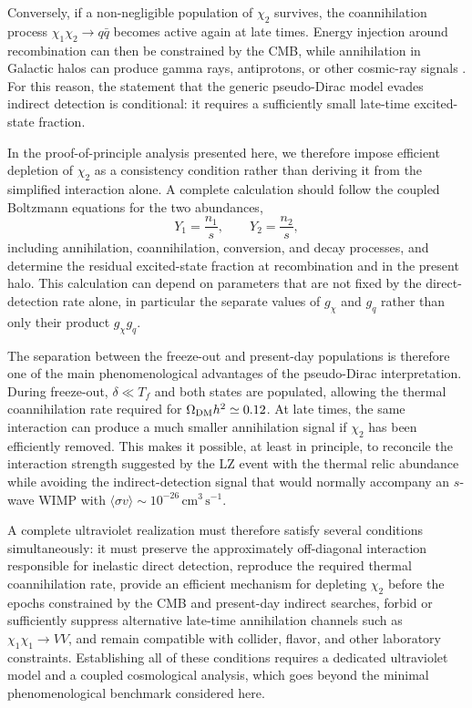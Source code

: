 \documentclass[aps,prd,reprint,superscriptaddress,nofootinbib,longbibliography,floatfix]{revtex4-2}
\begin{document}
Conversely, if a non-negligible population of $\chi_2$ survives, the coannihilation process $\chi_1\chi_2\rightarrow q\bar q$ becomes active again at late times. Energy injection around recombination can then be constrained by the CMB, while annihilation in Galactic halos can produce gamma rays, antiprotons, or other cosmic-ray signals \cite{Slatyer2016}. For this reason, the statement that the generic pseudo-Dirac model evades indirect detection is conditional: it requires a sufficiently small late-time excited-state fraction.

In the proof-of-principle analysis presented here, we therefore impose efficient depletion of $\chi_2$ as a consistency condition rather than deriving it from the simplified interaction alone. A complete calculation should follow the coupled Boltzmann equations for the two abundances,
\begin{equation}
Y_1=\frac{n_1}{s},
\qquad
Y_2=\frac{n_2}{s},
\end{equation}
including annihilation, coannihilation, conversion, and decay processes, and determine the residual excited-state fraction at recombination and in the present halo. This calculation can depend on parameters that are not fixed by the direct-detection rate alone, in particular the separate values of $g_\chi$ and $g_q$ rather than only their product $g_\chi g_q$.

The separation between the freeze-out and present-day populations is therefore one of the main phenomenological advantages of the pseudo-Dirac interpretation. During freeze-out, $\delta\ll T_f$ and both states are populated, allowing the thermal coannihilation rate required for $\Omega_{\rm DM}h^2\simeq0.12$. At late times, the same interaction can produce a much smaller annihilation signal if $\chi_2$ has been efficiently removed. This makes it possible, at least in principle, to reconcile the interaction strength suggested by the LZ event with the thermal relic abundance while avoiding the indirect-detection signal that would normally accompany an $s$-wave WIMP with $\langle\sigma v\rangle\sim10^{-26}\,\mathrm{cm^3\,s^{-1}}$.

A complete ultraviolet realization must therefore satisfy several conditions simultaneously: it must preserve the approximately off-diagonal interaction responsible for inelastic direct detection, reproduce the required thermal coannihilation rate, provide an efficient mechanism for depleting $\chi_2$ before the epochs constrained by the CMB and present-day indirect searches, forbid or sufficiently suppress alternative late-time annihilation channels such as $\chi_1\chi_1\rightarrow VV$, and remain compatible with collider, flavor, and other laboratory constraints. Establishing all of these conditions requires a dedicated ultraviolet model and a coupled cosmological analysis, which goes beyond the minimal phenomenological benchmark considered here.
\end{document}
